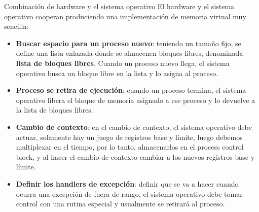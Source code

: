 \documentclass{article}
\begin{document}
\begin{summary}{Combinación de hardware y el sistema operativo}
    El hardware y el sistema operativo cooperan produciendo una implementación de memoria virtual muy sencilla:
    \begin{itemize}
        \item \textbf{Buscar espacio para un proceso nuevo}: teniendo un tamaño fijo, se define una lista enlazada donde se almacenen bloques libres, denominada \textbf{lista de bloques libres}. Cuando un proceso nuevo llega, el sistema operativo busca un bloque libre en la lista y lo asigna al proceso.
        \item \textbf{Proceso se retira de ejecución}: cuando un proceso termina, el sistema operativo libera el bloque de memoria asignado a ese proceso y lo devuelve a la lista de bloques libres.
        \item \textbf{Cambio de contexto}: en el cambio de contexto, el sistema operativo debe actuar, solamente hay un juego de registros base y límite, luego debemos multiplexar en el tiempo, por lo tanto, almacenarlos en el process control block, y al hacer el cambio de contexto cambiar a los nuevos registros base y límite.
        \item \textbf{Definir los handlers de excepción}: definir que se va a hacer cuando ocurra una excepción de fuera de rango, el sistema operativo debe tomar control con una rutina especial y usualmente se retirará al proceso.
    \end{itemize}
\end{summary}

\newpage
\end{document}
